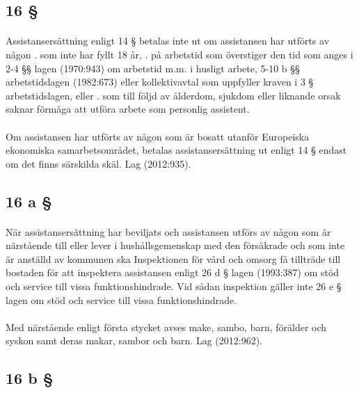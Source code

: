 \documentclass[a4paper,notitlepage,openany,10pt]{book}
\begin{document}
\subsection*{16 §}
\paragraph*{}
Assistansersättning enligt 14 § betalas inte ut om assistansen har utförts av någon
. som inte har fyllt 18 år,
. på arbetstid som överstiger den tid som anges i 2-4 §§ lagen (1970:943) om arbetstid m.m. i husligt arbete, 5-10 b §§ arbetstidslagen (1982:673) eller kollektivavtal som uppfyller kraven i 3 § arbetstidslagen, eller
. som till följd av ålderdom, sjukdom eller liknande orsak saknar förmåga att utföra arbete som personlig assistent.
\paragraph*{}
Om assistansen har utförts av någon som är bosatt utanför Europeiska ekonomiska samarbetsområdet, betalas assistansersättning ut enligt 14 § endast om det finns särskilda skäl.
Lag (2012:935).
\subsection*{16 a §}
\paragraph*{}
När assistansersättning har beviljats och assistansen utförs av någon som är närstående till eller lever i hushållsgemenskap med den försäkrade och som inte är anställd av kommunen ska Inspektionen för vård och omsorg få tillträde till bostaden för att inspektera assistansen enligt 26 d § lagen (1993:387) om stöd och service till vissa funktionshindrade. Vid sådan inspektion gäller inte 26 e § lagen om stöd och service till vissa funktionshindrade.
\paragraph*{}
Med närstående enligt första stycket avses make, sambo, barn, förälder och syskon samt deras makar, sambor och barn.
Lag (2012:962).
\subsection*{16 b §}
\end{document}
